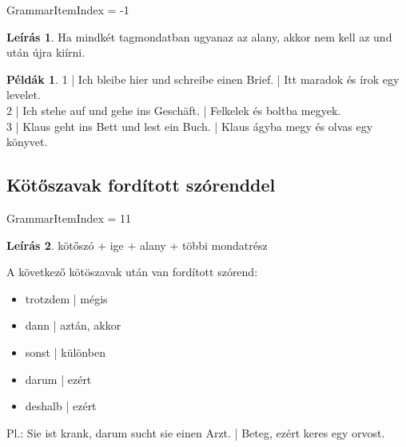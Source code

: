\documentclass{article}
\theoremstyle{definition}
\newtheorem*{exmp}{Példák}
\newtheorem*{desc}{Leírás}
\begin{document}
GrammarItemIndex = -1

\begin{desc}
Ha mindkét tagmondatban ugyanaz az alany, akkor nem kell az und után újra kiírni.
\end{desc}

\begin{exmp}
1 | Ich bleibe hier und schreibe einen Brief. | Itt maradok és írok egy levelet.\\
2 | Ich stehe auf und gehe ins Geschäft. | Felkelek és boltba megyek.\\
3 | Klaus geht ins Bett und lest ein Buch. | Klaus ágyba megy és olvas egy könyvet.\\
\end{exmp}

\subsection{Kötőszavak fordított szórenddel}

GrammarItemIndex = 11

\begin{desc}

kötőszó + ige + alany + többi mondatrész

A következő kötöszavak után van fordított szórend:
\begin{itemize}
\item trotzdem | mégis
\item dann | aztán, akkor
\item sonst | különben
\item darum | ezért
\item deshalb | ezért
\end{itemize}

Pl.: Sie ist krank, darum sucht sie einen Arzt. | Beteg, ezért keres egy orvost.
\end{desc}
\end{document}
